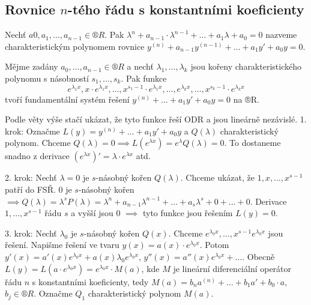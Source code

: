 \documentclass[12pt]{article}                   %
\begin{document}
    \subsection{Rovnice $n$-tého řádu s konstantními koeficienty}
        \begin{definice}
            Nechť $a0, a_1, …, a_{n-1} \in ®R$. Pak $\lambda^n + a_{n-1}·\lambda^{n-1} + … + a_1\lambda + a_0 = 0$ nazveme charakteristickým polynomem rovnice $y^{(n)} + a_{n-1}y^{(n-1)} + … + a_1y' + a_0y = 0$.
        \end{definice}

        \begin{veta}
            Mějme zadány $a_0, …, a_{n-1} \in ®R$ a nechť $\lambda_1, …, \lambda_k$ jsou kořeny charakteristického polynomu s násobností $s_1, …, s_k$. Pak funkce
            $$ e^{\lambda_1 x}, x·e^{\lambda_1 x}, …, x^{s_1 - 1}·e^{\lambda_1 x}, …, e^{\lambda_k x}, …, x^{s_{k} - 1}·e^{\lambda_k x} $$ 
            tvoří fundamentální systém řešení $y^{(n)} + … + a_1y' + a_0y = 0$ na ®R.

            \begin{dukazin}
                Podle věty výše stačí ukázat, že tyto funkce řeší ODR a jsou lineárně nezávislé. 1. krok: Označme $L(y) = y^{(n)} + … + a_1y' + a_0y$ a $Q(\lambda)$ charakteristický polynom. Chceme $Q(\lambda) = 0 \implies L(e^{\lambda x}) = e^{\lambda} Q(\lambda) = 0$. To dostaneme snadno z derivace $(e^{\lambda x})' = \lambda·e^{\lambda x}$ atd.

                2. krok: Nechť $\lambda = 0$ je $s$-násobný kořen $Q(\lambda)$. Chceme ukázat, že $1, x, …, x^{s-1}$ patří do FSŘ. $0$ je $s$-násobný kořen $\implies Q(\lambda) = \lambda^sP(\lambda) = \lambda^n + a_{n-1}\lambda^{n-1} + … + a_s\lambda^s + 0 + … + 0$. Derivace $1, …, x^{s-1}$ řádu $s$ a vyšší jsou $0$ $\implies$ tyto funkce jsou řešením $L(y) = 0$.


                3. krok: Nechť $\lambda_0$ je $s$-násobný kořen $Q(x)$. Chceme $e^{\lambda_0x}, …, x^{s-1}e^{\lambda_0x}$ jsou řešení. Napišme řešení ve tvaru $y(x) = a(x)·e^{\lambda_0 x}$. Potom $y'(x) = a'(x)e^{\lambda_0 x} + a(x)\lambda_0e^{\lambda_0x}$, $y''(x) = a''(x)e^{\lambda_0 x} + …$. Obecně $L(y) = L(a·e^{\lambda_0 x}) = e^{\lambda_0x}·M(a)$, kde $M$ je lineární diferenciální operátor řádu $n$ s konstantními koeficienty, tedy $M(a) = b_na^{(n)} + … + b_1a' + b_0·a$, $b_j \in ®R$. Označme $Q_1$ charakteristický polynom $M(a)$.
                

\end{dukazin}
\end{veta}
\end{document}
